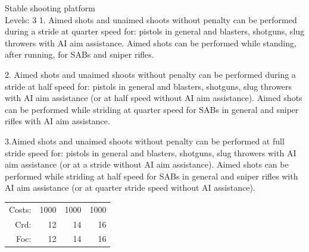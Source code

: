 \begin{skill}{Stable shooting platform \\\phantom{a}\hfill Levels: 3}
	\setlength{\parskip}{8pt}
	\setlength{\parindent}{0pt}
	1. Aimed shots and unaimed shoots without penalty can be performed during a stride at quarter speed for: pistols in general and blasters, shotguns, slug throwers with AI aim assistance. Aimed shots can be performed while standing, after running, for SABs and sniper rifles.

	2. Aimed shots and unaimed shoots without penalty can be performed during a stride at half speed for: pistols in general and blasters, shotguns, slug throwers with AI aim assistance (or at half speed without AI aim assistance). Aimed shots can be performed while striding at quarter speed for SABs in general and sniper rifles with AI aim assistance.

	 3.Aimed shots and unaimed shoots without penalty can be performed at full stride speed for: pistols in general and blasters, shotguns, slug throwers with AI aim assistance (or at a stride without AI aim assistance). Aimed shots can be performed while striding at half speed for SABs in general and sniper rifles with AI aim assistance (or at quarter stride speed without AI assistance).\\

	\hfill
	\begin{tabular}{rrrr}
		Costs: & 1000 & 1000 & 1000 \\
		Crd: & 12 & 14 & 16 \\
		Foc: & 12 & 14 & 16 \\
	\end{tabular}
\end{skill}

